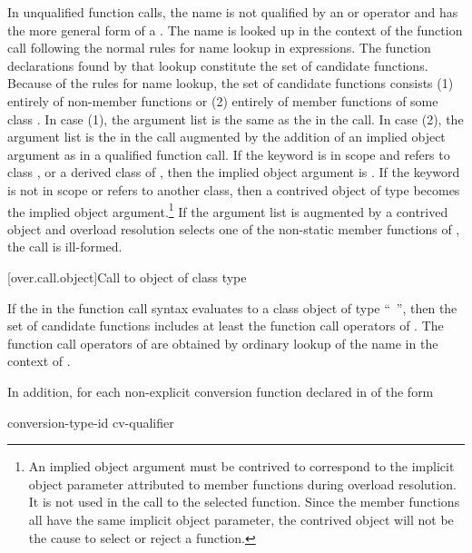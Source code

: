 \pnum
In unqualified function calls, the name is not qualified by an
\tcode{->}
or
operator and has the more general form of a
.
The name is looked up in the context of the function
call following the normal rules for name lookup
in expressions.
The function declarations found by that lookup constitute the
set of candidate functions.
Because of the rules for name lookup, the set of candidate functions
consists (1) entirely of non-member functions or (2) entirely of
member functions of some class
.
In case (1),
the argument list is
the same as the
in the call.
In case (2), the argument list is the
in the call augmented by the addition of an implied object
argument as in a qualified function call.
If the keyword
 is in scope and refers to
class
,
or a derived class of
,
then the implied object argument is
.
If the keyword
is not in
scope or refers to another class, then
a contrived object of type
becomes the implied object
argument.\footnote{An implied object argument must be contrived to
correspond to the implicit object
parameter attributed to member functions during overload resolution.
It is not
used in
the call to the selected function.
Since the member functions all have the
same implicit
object parameter, the contrived object will not be the cause to select or
reject a
function.}
If the argument list is augmented by a contrived object and overload
resolution selects one of the non-static member functions of
,
the call is ill-formed.

[over.call.object]{Call to object of class type}

\pnum
If the
in the function call syntax evaluates
to a class object of type ``\cv{}~'',
then the set of candidate
functions includes at least the function call operators of
.
The
function call operators of
are obtained by ordinary lookup of
the name
in the context of
.

\pnum
In addition, for each non-explicit conversion function declared in  of the
form

\begin{ncsimplebnf}
 conversion-type-id \terminal{(\,)} cv-qualifier    \terminal{;}
\end{ncsimplebnf}

